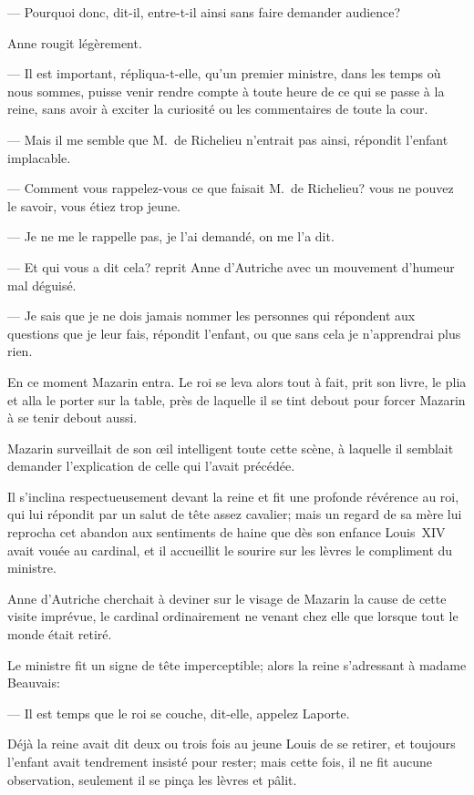 — Pourquoi donc, dit-il, entre-t-il ainsi sans faire demander audience?

Anne rougit légèrement.

— Il est important, répliqua-t-elle, qu'un premier ministre, dans les temps où nous sommes, puisse venir rendre compte à toute heure de ce qui se passe à la reine, sans avoir à exciter la curiosité ou les commentaires de toute la cour.

— Mais il me semble que M.~de Richelieu n'entrait pas ainsi, répondit l'enfant implacable.

— Comment vous rappelez-vous ce que faisait M.~de Richelieu? vous ne pouvez le savoir, vous étiez trop jeune.

— Je ne me le rappelle pas, je l'ai demandé, on me l'a dit.

— Et qui vous a dit cela? reprit Anne d'Autriche avec un mouvement d'humeur mal déguisé.

— Je sais que je ne dois jamais nommer les personnes qui répondent aux questions que je leur fais, répondit l'enfant, ou que sans cela je n'apprendrai plus rien.

En ce moment Mazarin entra. Le roi se leva alors tout à fait, prit son livre, le plia et alla le porter sur la table, près de laquelle il se tint debout pour forcer Mazarin à se tenir debout aussi.

Mazarin surveillait de son œil intelligent toute cette scène, à laquelle il semblait demander l'explication de celle qui l'avait précédée.

Il s'inclina respectueusement devant la reine et fit une profonde révérence au roi, qui lui répondit par un salut de tête assez cavalier; mais un regard de sa mère lui reprocha cet abandon aux sentiments de haine que dès son enfance Louis~XIV avait vouée au cardinal, et il accueillit le sourire sur les lèvres le compliment du ministre.

Anne d'Autriche cherchait à deviner sur le visage de Mazarin la cause de cette visite imprévue, le cardinal ordinairement ne venant chez elle que lorsque tout le monde était retiré.

Le ministre fit un signe de tête imperceptible; alors la reine s'adressant à madame Beauvais:

— Il est temps que le roi se couche, dit-elle, appelez Laporte.

Déjà la reine avait dit deux ou trois fois au jeune Louis de se retirer, et toujours l'enfant avait tendrement insisté pour rester; mais cette fois, il ne fit aucune observation, seulement il se pinça les lèvres et pâlit.

